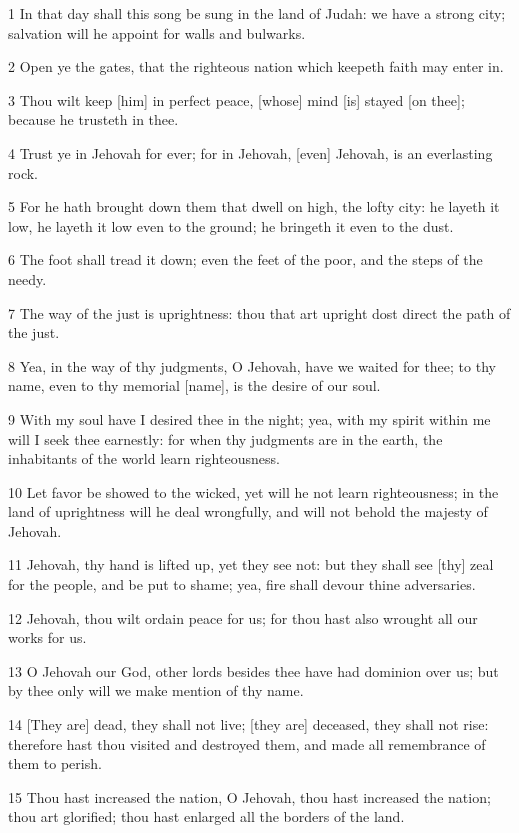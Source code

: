 \par 1 In that day shall this song be sung in the land of Judah: we have a strong city; salvation will he appoint for walls and bulwarks.
\par 2 Open ye the gates, that the righteous nation which keepeth faith may enter in.
\par 3 Thou wilt keep [him] in perfect peace, [whose] mind [is] stayed [on thee]; because he trusteth in thee.
\par 4 Trust ye in Jehovah for ever; for in Jehovah, [even] Jehovah, is an everlasting rock.
\par 5 For he hath brought down them that dwell on high, the lofty city: he layeth it low, he layeth it low even to the ground; he bringeth it even to the dust.
\par 6 The foot shall tread it down; even the feet of the poor, and the steps of the needy.
\par 7 The way of the just is uprightness: thou that art upright dost direct the path of the just.
\par 8 Yea, in the way of thy judgments, O Jehovah, have we waited for thee; to thy name, even to thy memorial [name], is the desire of our soul.
\par 9 With my soul have I desired thee in the night; yea, with my spirit within me will I seek thee earnestly: for when thy judgments are in the earth, the inhabitants of the world learn righteousness.
\par 10 Let favor be showed to the wicked, yet will he not learn righteousness; in the land of uprightness will he deal wrongfully, and will not behold the majesty of Jehovah.
\par 11 Jehovah, thy hand is lifted up, yet they see not: but they shall see [thy] zeal for the people, and be put to shame; yea, fire shall devour thine adversaries.
\par 12 Jehovah, thou wilt ordain peace for us; for thou hast also wrought all our works for us.
\par 13 O Jehovah our God, other lords besides thee have had dominion over us; but by thee only will we make mention of thy name.
\par 14 [They are] dead, they shall not live; [they are] deceased, they shall not rise: therefore hast thou visited and destroyed them, and made all remembrance of them to perish.
\par 15 Thou hast increased the nation, O Jehovah, thou hast increased the nation; thou art glorified; thou hast enlarged all the borders of the land.

